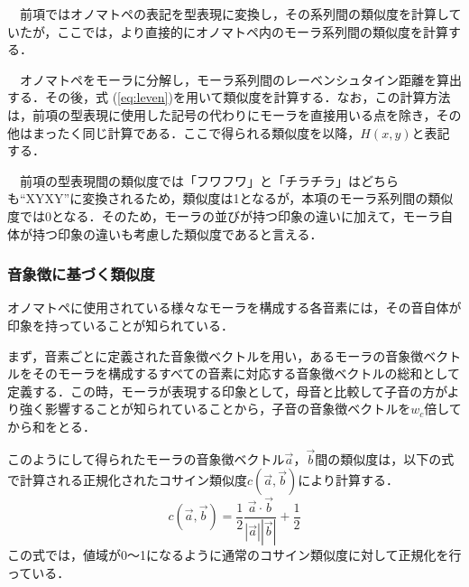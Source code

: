 \documentclass[japanese]{jnlp_1.4}
\newcommand{\addtext}[1]{}
\begin{document}
\begin{enumerate}
　前項ではオノマトペの表記を型表現に変換し，その系列間の類似度を計算していたが，ここでは，より直接的にオノマトペ内のモーラ系列間の類似度を計算する．

　オノマトペをモーラに分解し，モーラ系列間のレーベンシュタイン距離を算出する．その後，式 (\ref{eq:leven})を用いて類似度を計算する．なお，この計算方法は，前項の型表現に使用した記号の代わりにモーラを直接用いる点を除き，その他はまったく同じ計算である．ここで得られる類似度を以降，$H(x, y)$と表記する．

　前項の型表現間の類似度では「フワフワ」と「チラチラ」はどちらも``XYXY''に変換されるため，類似度は1となるが，本項のモーラ系列間の類似度では0となる．そのため，モーラの並びが持つ印象の違いに加えて，モーラ自体が持つ印象の違いも考慮した類似度であると言える．

\end{enumerate}


\subsubsection{音象徴に基づく類似度}


オノマトペに使用されている様々なモーラを構成する各音素には，その音自体が印象を持っていることが知られている．\addtext{この各音素が表現する印象をベクトルとして表現したものに音象徴{\cite{Article_05}}がある．そこで，音象徴を基に類似度を計算する．なお，音象徴}
\addtext{ベクトルは，「強さ」，「硬さ」，「湿度」，「滑らかさ」，「丸さ」，「弾性」，「速さ」，「温かさ」の8次元の属性を有し，各属性に$-2$から2までの5段階の数値を与えることで音素が表現する印象を定義している．}





まず，音素ごとに定義された音象徴ベクトルを用い，あるモーラの音象徴ベクトルをそのモーラを構成するすべての音素に対応する音象徴ベクトルの総和として定義する．この時，モーラが表現する印象として，母音と比較して子音の方がより強く影響することが知られている\cite{Article_05}ことから，子音の音象徴ベクトルを$w_{c}$倍してから和をとる．

このようにして得られたモーラの音象徴ベクトル$\vec{a}$，$\vec{b}$間の類似度は，以下の式で計算される正規化されたコサイン類似度$c(\vec{a}, \vec{b})$により計算する．
\begin{equation}
c(\vec{a}, \vec{b}) = \frac{1}{2}\frac{\vec{a}\cdot\vec{b}}{|\vec{a}||\vec{b}|} + \frac{1}{2}\label{eq:cosine}
\end{equation}
この式では，値域が0〜1になるように通常のコサイン類似度に対して正規化を行っている．
\end{document}
